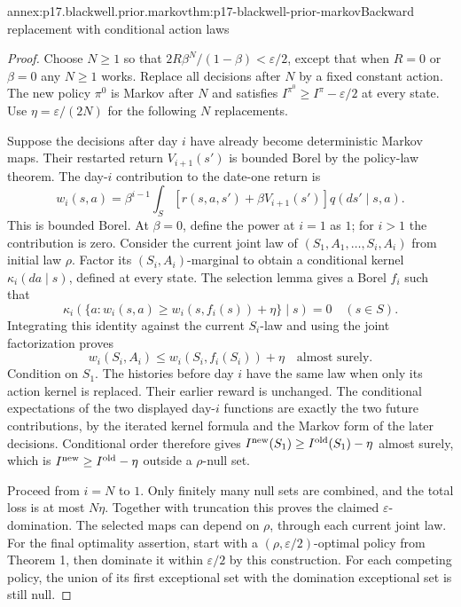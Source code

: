 \begin{annexitem}{annex:p17.blackwell.prior.markov}{thm:p17-blackwell-prior-markov}{Backward replacement with conditional action laws}
\begin{proof}
Choose \(N\geq1\) so that
\(2R\beta^N/(1-\beta)<\varepsilon/2\), except that when
\(R=0\) or \(\beta=0\) any \(N\geq1\) works.
Replace all decisions after \(N\) by a fixed constant action.
The new policy \(\pi^0\) is Markov after \(N\) and satisfies
\(I^{\pi^0}\geq I^\pi-\varepsilon/2\) at every state.
Use \(\eta=\varepsilon/(2N)\) for the following \(N\) replacements.

Suppose the decisions after day \(i\) have already become
deterministic Markov maps. Their restarted return
\(V_{i+1}(s')\) is bounded Borel by the policy-law theorem.
The day-\(i\) contribution to the date-one return is
\[
 w_i(s,a)=\beta^{i-1}\int_S
          [r(s,a,s')+\beta V_{i+1}(s')]q(ds'\mid s,a).
\]
This is bounded Borel. At \(\beta=0\), define the power
at \(i=1\) as \(1\); for \(i>1\) the contribution is zero.
Consider the current joint law of
\((S_1,A_1,\ldots,S_i,A_i)\) from initial law \(\rho\).
Factor its \((S_i,A_i)\)-marginal to obtain a conditional
kernel \(\kappa_i(da\mid s)\), defined at every state.
The selection lemma gives a Borel \(f_i\) such that
\[
 \kappa_i(\{a:w_i(s,a)\geq w_i(s,f_i(s))+\eta\}\mid s)=0
                                                  \quad(s\in S).
\]
Integrating this identity against the current \(S_i\)-law
and using the joint factorization proves
\[
             w_i(S_i,A_i)\leq w_i(S_i,f_i(S_i))+\eta
                        \quad\text{almost surely}.
\]
Condition on \(S_1\). The histories before day \(i\) have
the same law when only its action kernel is replaced.
Their earlier reward is unchanged. The conditional
expectations of the two displayed day-\(i\) functions are
exactly the two future contributions, by the iterated
kernel formula and the Markov form of the later decisions.
Conditional order therefore gives
\(I^{\rm new}(S_1)\geq I^{\rm old}(S_1)-\eta\) almost surely,
which is \(I^{\rm new}\geq I^{\rm old}-\eta\)
outside a \(\rho\)-null set.

Proceed from \(i=N\) to \(1\). Only finitely many null
sets are combined, and the total loss is at most \(N\eta\).
Together with truncation this proves the claimed
\(\varepsilon\)-domination. The selected maps can depend
on \(\rho\), through each current joint law.
For the final optimality assertion, start with a
\((\rho,\varepsilon/2)\)-optimal policy from Theorem 1,
then dominate it within \(\varepsilon/2\) by this construction.
For each competing policy, the union of its first exceptional
set with the domination exceptional set is still null.
\end{proof}
\end{annexitem}

